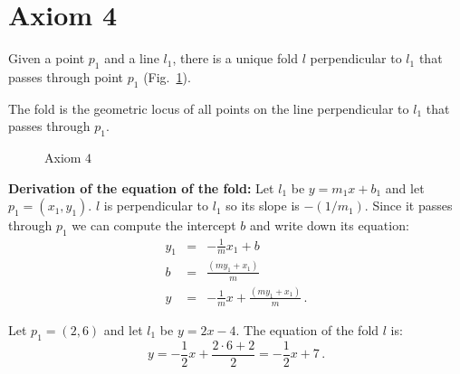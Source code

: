 

\section{Axiom 4}\label{s.ax4}

\begin{axiom}
Given a point $p_1$ and a line $l_1$, there is a unique fold $l$ perpendicular to $l_1$ that passes through point $p_1$ (Fig.~\ref{f.origami-axiom4}).
\end{axiom}

The fold is the geometric locus of all points on the line perpendicular to $l_1$ that passes through $p_1$.

\begin{figure}[ht]
\begin{center}
\end{center}
\caption{Axiom $4$}\label{f.origami-axiom4}
\end{figure}

\noindent\textbf{Derivation of the equation of the fold:}
Let $l_1$ be $y = m_1x + b_1$ and let $p_1=(x_1,y_1)$.  $l$ is perpendicular to $l_1$ so its slope is $-(1/m_1)$. Since it passes through $p_1$ we can compute the intercept $b$ and write down its equation:
\begin{eqnarray*}
y_1&=&-\frac{1}{m} x_1 + b\\
b&=& \frac{(my_1+x_1)}{m}\\
y&=&-\frac{1}{m} x +\frac{(my_1+x_1)}{m}\,.
\end{eqnarray*}
\begin{example}
Let $p_1=(2,6)$ and let $l_1$ be $y=2x-4$. The equation of the fold $l$ is:
\[
y=-\frac{1}{2}x + \frac{2\cdot 6 + 2}{2}=-\frac{1}{2}x + 7\,.
\]
\end{example}


